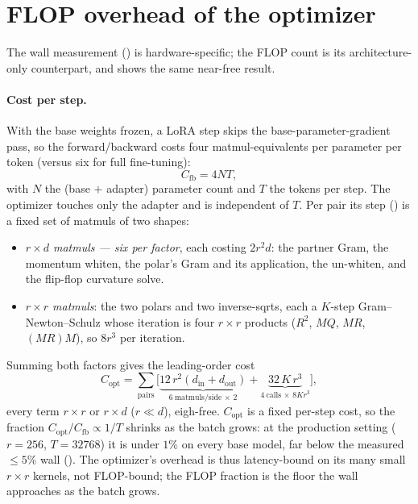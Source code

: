 \documentclass[11pt]{article}
\theoremstyle{plain}
\theoremstyle{definition}
\theoremstyle{remark}
\begin{document}
\section{FLOP overhead of the optimizer}
\label{app:flops}
The wall measurement () is hardware-specific; the FLOP count is
its architecture-only counterpart, and shows the same near-free result.

\paragraph{Cost per step.} With the base weights frozen, a LoRA step skips the
base-parameter-gradient pass, so the forward/backward costs four matmul-equivalents per
parameter per token (versus six for full fine-tuning):
\begin{equation}
  C_{\mathrm{fb}}=4NT,
  \label{eq:flop-fb}
\end{equation}
with $N$ the (base $+$ adapter) parameter count and $T$ the tokens per step. The
optimizer touches only the adapter and is independent of $T$. Per pair its step
() is a fixed set of matmuls of two shapes:
\begin{itemize}[leftmargin=1.5em,itemsep=1pt,topsep=2pt]
  \item \emph{$r\times d$ matmuls --- six per factor}, each costing $2r^2d$: the partner
        Gram, the momentum whiten, the polar's Gram and its application, the un-whiten,
        and the flip-flop curvature solve.
  \item \emph{$r\times r$ matmuls}: the two polars and two inverse-sqrts, each a
        $K$-step Gram--Newton--Schulz whose iteration is four $r\times r$ products
        ($R^2$, $MQ$, $MR$, $(MR)M$), so $8r^3$ per iteration.
\end{itemize}
Summing both factors gives the leading-order cost
\begin{equation}
  C_{\mathrm{opt}}=\sum_{\text{pairs}}\Big[
    \underbrace{12\,r^2(d_{\mathrm{in}}{+}d_{\mathrm{out}})}_{6\ \text{matmuls/side}\,\times\,2}
    +\underbrace{32\,K\,r^3}_{4\ \text{calls}\,\times\,8Kr^3}\Big],
  \label{eq:flop-opt}
\end{equation}
every term $r\times r$ or $r\times d$ ($r\ll d$), eigh-free. $C_{\mathrm{opt}}$ is a
fixed per-step cost, so the fraction $C_{\mathrm{opt}}/C_{\mathrm{fb}}\propto1/T$ shrinks
as the batch grows: at the production setting ($r{=}256$, $T{=}32768$) it is under $1\%$
on every base model, far below the measured ${\le}5\%$ wall ().
The optimizer's overhead is thus latency-bound on its many small $r\times r$ kernels, not
FLOP-bound; the FLOP fraction is the floor the wall approaches as the batch grows.
\end{document}
